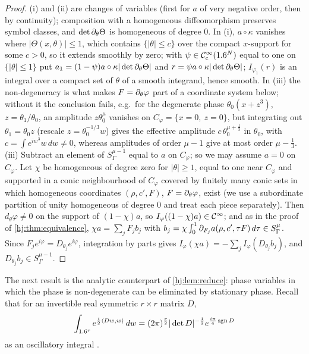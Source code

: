 \begin{proof}
  (i) and (ii) are changes of variables (first for $a$ of very negative order,
  then by continuity); composition with a homogeneous diffeomorphism preserves
  symbol classes, and $\det\partial_\theta\Theta$ is homogeneous of degree $0$.  In (i),
  $a\circ\kappa$ vanishes where $|\Theta(x,\theta)|\le1$, which contains $\{|\theta|\le
  c\}$ over the compact $x$-support for some $c>0$, so it extends smoothly by zero;
  with $\psi\in\mathcal{C}^\infty_{\mathrm{c}}(1.6^N)$ equal to one on $\{|\theta|\le1\}$ put
  $a_1=(1-\psi)a\circ\kappa|\det\partial_\theta\Theta|$ and $r=\psi a\circ\kappa|\det
  \partial_\theta\Theta|$; $I_{\varphi_1}(r)$ is an integral over a compact set of $\theta$
  of a smooth integrand, hence smooth.  In (iii) the non-degeneracy is what makes
  $F=\partial_\theta\varphi$ part of a coordinate system below; without it the conclusion
  fails, e.g.\ for the degenerate phase $\theta_0(x+z^3)$, $z=\theta_1/\theta_0$, an
  amplitude $z\theta_0^\mu$ vanishes on $C_\varphi=\{x=0,\ z=0\}$, but integrating
  out $\theta_1=\theta_0z$ (rescale $z=\theta_0^{-1/3}w$) gives the effective
  amplitude $c\,\theta_0^{\mu+\frac13}$ in $\theta_0$, with $c=\int e^{iw^3}w\,dw\ne0$,
  whereas amplitudes of order $\mu-1$ give at most order $\mu-\frac13$.
  (iii) Subtract an element of $S^{\mu-1}_\Gamma$ equal to $a$ on $C_\varphi$; so we
  may assume $a=0$ on $C_\varphi$.  Let $\chi$ be homogeneous of degree zero for
  $|\theta|\ge1$, equal to one near $C_\varphi$ and supported in a conic
  neighbourhood of $C_\varphi$ covered by finitely many conic sets in which
  homogeneous coordinates $(\rho,c',F)$, $F=\partial_\theta\varphi$, exist (we use a
  subordinate partition of unity homogeneous of degree $0$ and treat each piece
  separately).  Then $d_\theta\varphi\neq0$ on the support of $(1-\chi)a$, so
  $I_\varphi((1-\chi)a)\in\mathcal{C}^\infty$; and as in the proof of
  \cref{hj:thm:equivalence}, $\chi a=\sum_jF_jb_j$ with
  $b_j=\chi\int_0^1\partial_{F_j}a(\rho,c',\tau F)\,d\tau\in S^\mu_\Gamma$.  Since
  $F_je^{i\varphi}=D_{\theta_j}e^{i\varphi}$, integration by parts gives
  $I_\varphi(\chi a)=-\sum_jI_\varphi(D_{\theta_j}b_j)$, and $D_{\theta_j}b_j\in
  S^{\mu-1}_\Gamma$.
\end{proof}

The next result is the analytic counterpart of \cref{hj:lem:reduce}: phase
variables in which the phase is non-degenerate can be eliminated by
stationary phase.  Recall that for an invertible real symmetric $r\times r$
matrix $D$,
\begin{equation}\label{hj:eq:fresnel}
  \int_{1.6^r}e^{\frac i2\langle Dw,w\rangle}\,dw=(2\pi)^{\frac r2}|\det D|^{-\frac12}
  e^{\frac{i\pi}4\operatorname{sgn} D}
\end{equation}
as an oscillatory integral \cite[Section~7.6]{Hormander-I}.

